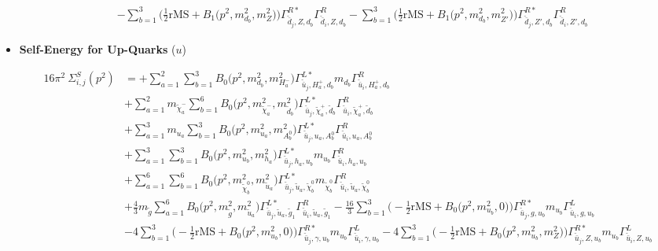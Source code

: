 \begin{itemize}
\begin{align}
 &- \sum_{b=1}^{3}\Big(\frac{1}{2} \text{rMS}  + {B_1\Big(p^{2},m^2_{d_{{b}}},m^2_{Z}\Big)}\Big){\Gamma^{R*}_{\check{\bar{d}}_{{j}},Z,d_{{b}}}} {\Gamma^R_{\check{\bar{d}}_{{i}},Z,d_{{b}}}}  - \sum_{b=1}^{3}\Big(\frac{1}{2} \text{rMS}  + {B_1\Big(p^{2},m^2_{d_{{b}}},m^2_{{Z'}}\Big)}\Big){\Gamma^{R*}_{\check{\bar{d}}_{{j}},{Z'},d_{{b}}}} {\Gamma^R_{\check{\bar{d}}_{{i}},{Z'},d_{{b}}}}   
\end{align} 
\item {\bf Self-Energy for Up-Quarks} \thickspace (\(u\)) 

\begin{align} 
16\pi^2 \ \Sigma^S_{i,j}(p^2) &= +\sum_{a=1}^{2}\sum_{b=1}^{3}{B_0\Big(p^{2},m^2_{d_{{b}}},m^2_{H^-_{{a}}}\Big)} {\Gamma^{L*}_{\check{\bar{u}}_{{j}},H^+_{{a}},d_{{b}}}} m_{d_{{b}}} {\Gamma^R_{\check{\bar{u}}_{{i}},H^+_{{a}},d_{{b}}}} \nonumber \\ 
 &+\sum_{a=1}^{2}m_{\tilde{\chi}^-_{{a}}} \sum_{b=1}^{6}{B_0\Big(p^{2},m^2_{\tilde{\chi}^-_{{a}}},m^2_{\tilde{d}_{{b}}}\Big)} {\Gamma^{L*}_{\check{\bar{u}}_{{j}},\tilde{\chi}^+_{{a}},\tilde{d}_{{b}}}} {\Gamma^R_{\check{\bar{u}}_{{i}},\tilde{\chi}^+_{{a}},\tilde{d}_{{b}}}}  \nonumber \\ 
 &+\sum_{a=1}^{3}m_{u_{{a}}} \sum_{b=1}^{3}{B_0\Big(p^{2},m^2_{u_{{a}}},m^2_{A^0_{{b}}}\Big)} {\Gamma^{L*}_{\check{\bar{u}}_{{j}},u_{{a}},A^0_{{b}}}} {\Gamma^R_{\check{\bar{u}}_{{i}},u_{{a}},A^0_{{b}}}}  \nonumber \\ 
 &+\sum_{a=1}^{3}\sum_{b=1}^{3}{B_0\Big(p^{2},m^2_{u_{{b}}},m^2_{h_{{a}}}\Big)} {\Gamma^{L*}_{\check{\bar{u}}_{{j}},h_{{a}},u_{{b}}}} m_{u_{{b}}} {\Gamma^R_{\check{\bar{u}}_{{i}},h_{{a}},u_{{b}}}} \nonumber \\ 
 &+\sum_{a=1}^{6}\sum_{b=1}^{6}{B_0\Big(p^{2},m^2_{\tilde{\chi}^0_{{b}}},m^2_{\tilde{u}_{{a}}}\Big)} {\Gamma^{L*}_{\check{\bar{u}}_{{j}},\tilde{u}_{{a}},\tilde{\chi}^0_{{b}}}} m_{\tilde{\chi}^0_{{b}}} {\Gamma^R_{\check{\bar{u}}_{{i}},\tilde{u}_{{a}},\tilde{\chi}^0_{{b}}}} \nonumber \\ 
 &+\frac{4}{3} m_{\tilde{g}} \sum_{a=1}^{6}{B_0\Big(p^{2},m^2_{\tilde{g}},m^2_{\tilde{u}_{{a}}}\Big)} {\Gamma^{L*}_{\check{\bar{u}}_{{j}},\tilde{u}_{{a}},\tilde{g}_{{1}}}} {\Gamma^R_{\check{\bar{u}}_{{i}},\tilde{u}_{{a}},\tilde{g}_{{1}}}}  -\frac{16}{3} \sum_{b=1}^{3}\Big(-\frac{1}{2} \text{rMS}  + {B_0\Big(p^{2},m^2_{u_{{b}}},0\Big)}\Big){\Gamma^{R*}_{\check{\bar{u}}_{{j}},g,u_{{b}}}} m_{u_{{b}}} {\Gamma^L_{\check{\bar{u}}_{{i}},g,u_{{b}}}}  \nonumber \\ 
 &-4 \sum_{b=1}^{3}\Big(-\frac{1}{2} \text{rMS}  + {B_0\Big(p^{2},m^2_{u_{{b}}},0\Big)}\Big){\Gamma^{R*}_{\check{\bar{u}}_{{j}},\gamma,u_{{b}}}} m_{u_{{b}}} {\Gamma^L_{\check{\bar{u}}_{{i}},\gamma,u_{{b}}}}  -4 \sum_{b=1}^{3}\Big(-\frac{1}{2} \text{rMS}  + {B_0\Big(p^{2},m^2_{u_{{b}}},m^2_{Z}\Big)}\Big){\Gamma^{R*}_{\check{\bar{u}}_{{j}},Z,u_{{b}}}} m_{u_{{b}}} {\Gamma^L_{\check{\bar{u}}_{{i}},Z,u_{{b}}}}  \nonumber \\ 

\end{align}
\end{itemize}
